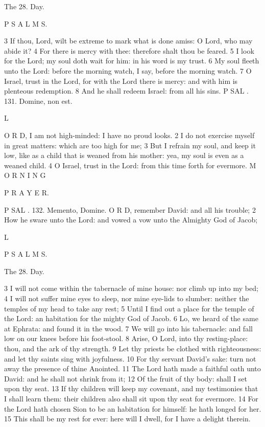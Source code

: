 The 28. Day.

P S A L M S.

3 If thou, Lord, wilt be extreme to mark what is done amiss: O Lord, who may abide it? 4 For there is mercy with thee: therefore shalt thou be feared. 5 I look for the Lord; my soul doth wait for him: in his word is my trust. 6 My soul fleeth unto the Lord: before the morning watch, I say, before the morning watch. 7 O Israel, trust in the Lord, for with the Lord there is mercy: and with him is plenteous redemption. 8 And he shall redeem Israel: from all his sins. P SAL . 131. Domine, non est.

L

O R D, I am not high-minded: I have no proud looks. 2 I do not exercise myself in great matters: which are too high for me; 3 But I refrain my soul, and keep it low, like as a child that is weaned from his mother: yea, my soul is even as a weaned child. 4 O Israel, trust in the Lord: from this time forth for evermore. M O R N I N G

P R A Y E R.

P SAL . 132. Memento, Domine. O R D, remember David: and all his trouble; 2 How he sware unto the Lord: and vowed a vow unto the Almighty God of Jacob;

L

P S A L M S.

The 28. Day.

3 I will not come within the tabernacle of mine house: nor climb up into my bed; 4 I will not suffer mine eyes to sleep, nor mine eye-lids to slumber: neither the temples of my head to take any rest; 5 Until I find out a place for the temple of the Lord: an habitation for the mighty God of Jacob. 6 Lo, we heard of the same at Ephrata: and found it in the wood. 7 We will go into his tabernacle: and fall low on our knees before his foot-stool. 8 Arise, O Lord, into thy resting-place: thou, and the ark of thy strength. 9 Let thy priests be clothed with righteousness: and let thy saints sing with joyfulness. 10 For thy servant David’s sake: turn not away the presence of thine Anointed. 11 The Lord hath made a faithful oath unto David: and he shall not shrink from it; 12 Of the fruit of thy body: shall I set upon thy seat. 13 If thy children will keep my covenant, and my testimonies that I shall learn them: their children also shall sit upon thy seat for evermore. 14 For the Lord hath chosen Sion to be an habitation for himself: he hath longed for her. 15 This shall be my rest for ever: here will I dwell, for I have a delight therein.

